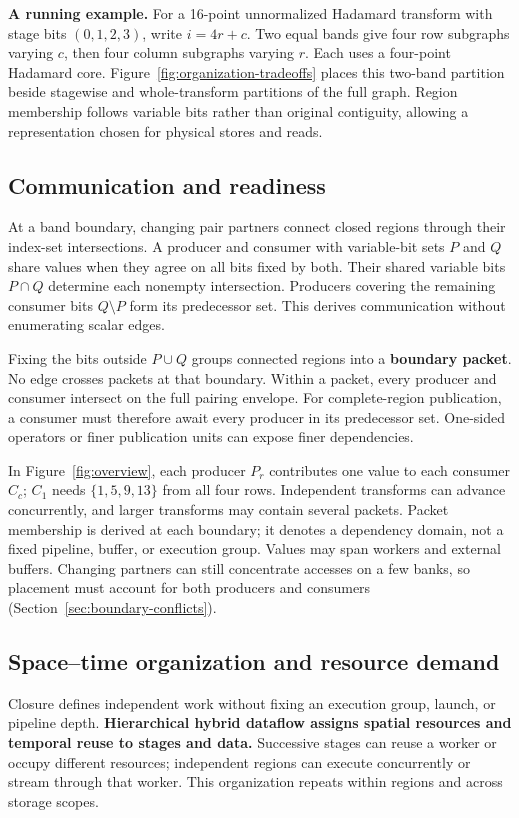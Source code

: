 \noindent\textbf{A running example.}
For a 16-point unnormalized Hadamard transform with stage bits $(0,1,2,3)$,
write $i=4r+c$. Two equal bands give four row subgraphs varying $c$, then
four column subgraphs varying $r$. Each uses a four-point Hadamard core.
Figure~\ref{fig:organization-tradeoffs} places this two-band partition beside
stagewise and whole-transform partitions of the full graph.
Region membership follows variable bits rather than original contiguity,
allowing a representation chosen for physical stores and reads.

\subsection{Communication and readiness}
\label{sec:handoff-construction}
At a band boundary, changing pair partners connect closed regions through
their index-set intersections.
A producer and consumer with variable-bit sets $P$ and $Q$ share values when
they agree on all bits fixed by both. Their shared variable bits $P\cap Q$
determine each nonempty intersection. Producers covering the remaining
consumer bits $Q\setminus P$ form its predecessor set. This derives
communication without enumerating scalar edges.

Fixing the bits outside $P\cup Q$ groups connected regions into a
\textbf{boundary packet}. No edge crosses packets at that boundary. Within
a packet, every producer and consumer intersect on the full pairing envelope.
For complete-region publication, a consumer must therefore await every
producer in its predecessor set. One-sided operators or finer publication
units can expose finer dependencies.

In Figure~\ref{fig:overview}, each producer $P_r$ contributes one value to
each consumer $C_c$; $C_1$ needs $\{1,5,9,13\}$ from all four rows.
Independent transforms can advance concurrently, and larger transforms may
contain several packets. Packet membership is derived at each boundary;
it denotes a dependency domain, not a fixed pipeline, buffer, or execution
group. Values may span workers and external buffers. Changing partners can
still concentrate accesses on a few banks, so placement must account for
both producers and consumers (Section~\ref{sec:boundary-conflicts}).

\subsection{Space--time organization and resource demand}
\label{sec:scaling}
Closure defines independent work without fixing an execution group, launch,
or pipeline depth. \textbf{Hierarchical hybrid dataflow assigns spatial resources
and temporal reuse to stages and data.} Successive stages can reuse a worker or
occupy different resources; independent regions can execute concurrently or
stream through that worker. This organization repeats within regions and
across storage scopes.

